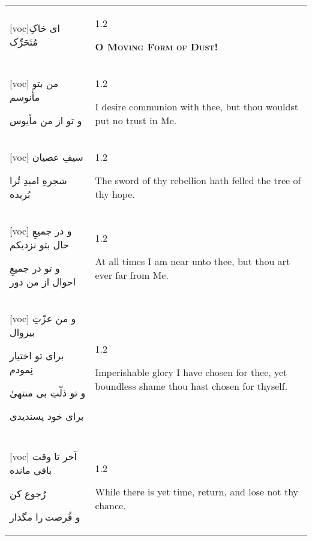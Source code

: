 \documentclass[11pt]{article}
\makeatletter
\newenvironment{orig}
  {\begin{farsi}[voc]}
  {\end{farsi}}
\newenvironment{trans}
  {\Large\begin{spacing}{1.2}\raggedright}
  {\end{spacing}}
\newenvironment{word}
  {\begin{tabular}[t]{p{2.75in}@{\hspace{3em}}p{2.75in}}}
  {\end{tabular}}
\newcommand{\ayat}[2]{\begin{orig}#1\end{orig} & \begin{trans}#2\end{trans}}
\newcommand{\heading}[2]{\textsc{\textbf{#1}} %
}
\makeatother
\begin{document}
\pagebreak

\begin{word}
\ayat{ای خاکِ مُتَحَرِّک}{\heading{O Moving Form of Dust!}{}} \\ \ayat{
من بتو مأنوسم

و تو از من مأيوس
}{I desire communion with thee, but thou wouldst put no trust in Me.} \\ \ayat{
سيفِ عصيان

شجرهِ اميدِ تُرا بُريده
}{The sword of thy rebellion hath felled the tree of thy hope.} \\ \ayat{
و در جميعِ حال بتو نزديکم

و تو در جميعِ احوال از من دور
}{At all times I am near unto thee, but thou art ever far from Me.} \\ \ayat{
و من عزّتِ بيزوال

برای تو اختيار نِمودم

و تو ذلّتِ بی منتهیٰ

برای خود پسنديدی
}{Imperishable glory I have chosen for thee, yet boundless shame thou hast
  chosen for thyself.} \\ \\ \ayat{
آخر تا وقت باقی مانده

رُجوع کن

و فُرصت را مگذار
}{While there is yet time, return, and lose not thy chance.}
\end{word}

\pagebreak
\end{document}
